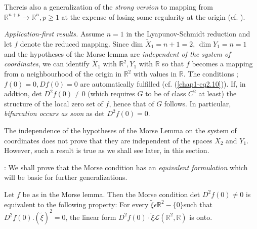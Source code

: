 \begin{remark}\label{chap1-rem3.2}
There\pageoriginale is also a generalization of the {\em strong version} to mapping from $\mathbb{R}^{n+p} \to \mathbb{R}^{n}, p \geq 1$ at the expense of losing some regularity at the origin (cf. \cite{5}).
\end{remark}

{\em Application-first results.} Assume $n = 1$ in the Lyapunov-Schmidt reduction and let $f$ denote the reduced mapping. Since dim $\widetilde{X}_{1} = n+1 = 2$, $\dim Y_{1} = n = 1$ and the hypotheses of the Morse lemma are {\em independent of the system of coordinates}, we can identify $\widetilde{X}_{1}$ with $\mathbb{R}^{2}, Y_{1}$ with $\mathbb{R}$ so that $f$ becomes a mapping from a neighbourhood of the origin in $\mathbb{R}^{2}$ with values in $\mathbb{R}$. The conditions ; $f(0) = 0, Df(0) = 0$ are automatically fulfilled (cf. (\ref{chap1-eq2.10})). If, in addtion, det $D^{2}f(0) \neq 0$ (which requires $G$ to be of class $C^{2}$ at least) the structure of the local zero set of $f$, hence that of $G$ follows. In particular, {\em bifurcation occurs as soon} as det $D^{2}f(0) = 0$.

\begin{remark}\label{chap1-rem3.3}
The independence of the hypotheses of the Morse Lemma on the system of coordinates does not prove that they are independent of the spaces $X_{2}$ and $Y_{1}$. However, such a result is true as we shall see later, in this section.
\end{remark}

\medskip
{}: We shall prove that the Morse condition has an {\em equivalent formulation} which will be basic for further generalizations.

\begin{lemma}\label{chap1-lem3.1}
Let $f$ be as in the Morse lemma. Then the Morse condition det $D^{2}f(0) \neq 0$ is equivalent to the following property: For every $\widetilde{\xi} \epsilon \mathbb{R}^{2} - \{0\}$\pageoriginale such that $D^{2}f(0).(\widetilde{\xi})^{2} = 0$, the linear form $D^{2}f(0) \cdot\tilde{\xi} \mathscr{L} (\mathbb{R}^{2}, \mathbb{R})$ is onto.
\end{lemma}

